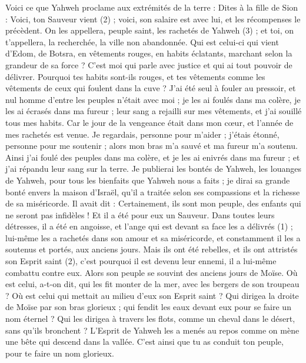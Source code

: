 \begin{multicols}{2}
Voici ce que Yahweh proclame aux extrémités de la terre : Dites à la fille de Sion : Voici, ton Sauveur vient (2) ; voici, son salaire est avec lui, et les récompenses le précèdent.
On les appellera, peuple saint, les rachetés de Yahweh (3) ; et toi, on t'appellera, la recherchée, la ville non abandonnée.
\VerseOne{}Qui est celui-ci qui vient d'Edom, de Botsra, en vêtements rouges, en habits éclatants, marchant selon la grandeur de sa force ? C'est moi qui parle avec justice et qui ai tout pouvoir de délivrer.
Pourquoi tes habits sont-ils rouges, et tes vêtements comme les vêtements de ceux qui foulent dans la cuve ?
J'ai été seul à fouler au pressoir, et nul homme d'entre les peuples n’était avec moi ; je les ai foulés dans ma colère, je les ai écrasés dans ma fureur ; leur sang a rejailli sur mes vêtements, et j'ai souillé tous mes habits.
Car le jour de la vengeance était dans mon cœur, et l'année de mes rachetés est venue.
Je regardais, personne pour m’aider ; j’étais étonné, personne pour me soutenir ; alors mon bras m'a sauvé et ma fureur m'a soutenu.
Ainsi j'ai foulé des peuples dans ma colère, et je les ai enivrés dans ma fureur ; et j'ai répandu leur sang sur la terre.
Je publierai les bontés de Yahweh, les louanges de Yahweh, pour tous les bienfaits que Yahweh nous a faits ; je dirai sa grande bonté envers la maison d’Israël, qu’il a traitée selon ses compassions et la richesse de sa miséricorde.
Il avait dit : Certainement, ils sont mon peuple, des enfants qui ne seront pas infidèles ! Et il a été pour eux un Sauveur.
Dans toutes leurs détresses, il a été en angoisse, et l'ange qui est devant sa face les a délivrés (1) ; lui-même les a rachetés dans son amour et sa miséricorde, et constamment il les a soutenus et portés, aux anciens jours.
Mais ils ont été rebelles, et ils ont attristés son Esprit saint (2), c'est pourquoi il est devenu leur ennemi, il a lui-même combattu contre eux.
Alors son peuple se souvint des anciens jours de Moïse. Où est celui, a-t-on dit, qui les fit monter de la mer, avec les bergers de son troupeau ? Où est celui qui mettait au milieu d'eux son Esprit saint ?
Qui dirigea la droite de Moïse par son bras glorieux ; qui fendit les eaux devant eux pour se faire un nom éternel ?
Qui les dirigea à travers les flots, comme un cheval dans le désert, sans qu’ils bronchent ?
L'Esprit de Yahweh les a menés au repos comme on mène une bête qui descend dans la vallée. C’est ainsi que tu as conduit ton peuple, pour te faire un nom glorieux.

\end{multicols}
